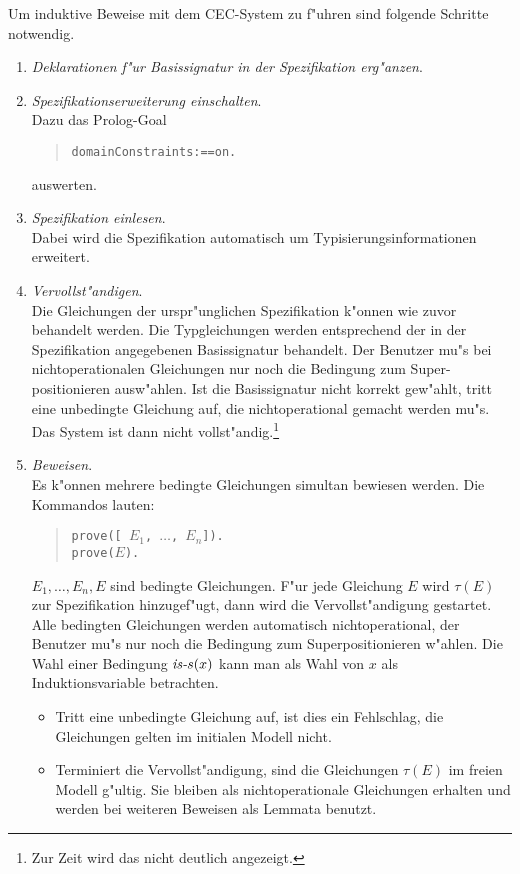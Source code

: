 Um induktive Beweise mit dem CEC-System zu f"uhren sind folgende Schritte
notwendig.
\begin{enumerate}
\item {\em Deklarationen f"ur Basissignatur in der Spezifikation erg"anzen}.

\item {\em Spezifikationserweiterung einschalten}.\hfill\\
      Dazu das Prolog-Goal
      \begin{verse}
         {\tt domainConstraints:==on.}
      \end{verse}
      auswerten.
\item {\em Spezifikation einlesen}.\hfill\\
      Dabei wird die Spezifikation automatisch um Typisierungsinformationen
      erweitert.

\item {\em Vervollst"andigen}.\hfill\\
      Die Gleichungen der urspr"unglichen Spezifikation k"onnen wie zuvor
      behandelt werden. Die Typgleichungen werden entsprechend der in der
      Spezifikation angegebenen Basissignatur behandelt. Der Benutzer mu"s
      bei nichtoperationalen Gleichungen nur noch die Bedingung zum Super-
      positionieren ausw"ahlen. Ist die Basissignatur nicht korrekt gew"ahlt,
      tritt eine unbedingte Gleichung auf, die nichtoperational gemacht
      werden mu"s. Das System ist dann nicht vollst"andig.\footnote{
      Zur Zeit wird das nicht deutlich angezeigt.}

\item {\em Beweisen}.\hfill\\
      Es k"onnen mehrere bedingte Gleichungen simultan bewiesen werden.
      Die Kommandos lauten:
      \begin{verse}
        {\tt prove([ $E_1$, $\ldots$, $E_n$]).} \\
        {\tt prove($E$).}
      \end{verse}
      \( E_1, \ldots, E_n,E \) sind bedingte Gleichungen. 
      F"ur jede Gleichung $E$ wird \( \tau(E) \) zur Spezifikation hinzugef"ugt,
      dann wird die Vervollst"andigung gestartet.
      Alle bedingten Gleichungen werden automatisch nichtoperational,
      der Benutzer mu"s nur noch die Bedingung zum Superpositionieren w"ahlen.
      Die Wahl einer Bedingung
        \( \tp{s}(x) \)
      kann man als Wahl von $x$ als Induktionsvariable betrachten.
      \begin{itemize}
      \item Tritt eine unbedingte Gleichung auf, ist dies ein Fehlschlag, die
            Gleichungen gelten im initialen Modell nicht.
      \item Terminiert die Vervollst"andigung, sind die Gleichungen
            \( \tau(E) \) im freien Modell g"ultig. Sie bleiben als 
            nichtoperationale Gleichungen erhalten und werden bei weiteren
            Beweisen als Lemmata benutzt.
      \end{itemize}
\end{enumerate}


